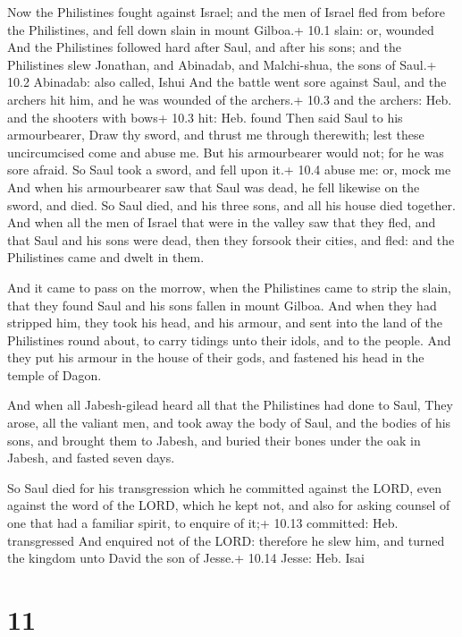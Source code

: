  Now the Philistines fought against Israel; and the men of
Israel fled from before the Philistines, and fell down slain in mount
Gilboa.+ 10.1 slain: or, wounded  And the Philistines
followed hard after Saul, and after his sons; and the Philistines slew
Jonathan, and Abinadab, and Malchi-shua, the sons of Saul.+ 10.2
Abinadab: also called, Ishui  And the battle went sore
against Saul, and the archers hit him, and he was wounded of the
archers.+ 10.3 and the archers: Heb. and the shooters with bows+ 10.3
hit: Heb. found  Then said Saul to his armourbearer, Draw
thy sword, and thrust me through therewith; lest these uncircumcised
come and abuse me. But his armourbearer would not; for he was sore
afraid. So Saul took a sword, and fell upon it.+ 10.4 abuse me: or, mock
me  And when his armourbearer saw that Saul was dead, he
fell likewise on the sword, and died.  So Saul died, and his
three sons, and all his house died together.  And when all
the men of Israel that were in the valley saw that they fled, and that
Saul and his sons were dead, then they forsook their cities, and fled:
and the Philistines came and dwelt in them.

 And it came to pass on the morrow, when the Philistines
came to strip the slain, that they found Saul and his sons fallen in
mount Gilboa.  And when they had stripped him, they took his
head, and his armour, and sent into the land of the Philistines round
about, to carry tidings unto their idols, and to the people.
 And they put his armour in the house of their gods, and
fastened his head in the temple of Dagon.

 And when all Jabesh-gilead heard all that the
Philistines had done to Saul,  They arose, all the valiant
men, and took away the body of Saul, and the bodies of his sons, and
brought them to Jabesh, and buried their bones under the oak in Jabesh,
and fasted seven days.

 So Saul died for his transgression which he committed
against the LORD, even against the word of the LORD, which he kept not,
and also for asking counsel of one that had a familiar spirit, to
enquire of it;+ 10.13 committed: Heb. transgressed  And
enquired not of the LORD: therefore he slew him, and turned the kingdom
unto David the son of Jesse.+ 10.14 Jesse: Heb. Isai

\hypertarget{section-10}{%
\section{11}\label{section-10}}

